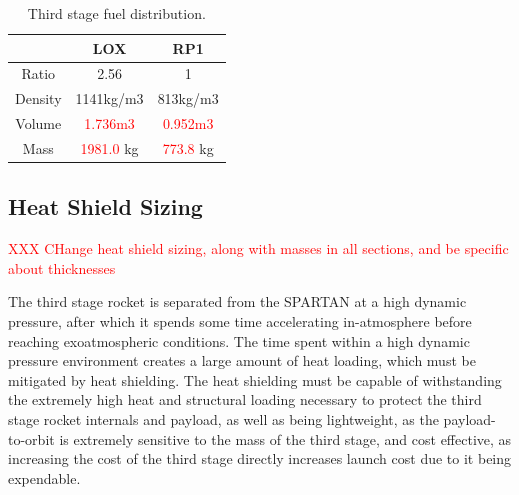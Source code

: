 	

\begin{table}[h]
	\centering
	\begin{tabular}{|c|c|c|}
		\hline  & \textbf{LOX} & \textbf{RP1} \\ 
		\hline Ratio & 2.56\cite{RPE} & 1 \\ 
		\hline Density & 1141kg/m3 & 813kg/m3\cite{Magee}\\ 
		\hline Volume & \textcolor{red}{1.736m3} & \textcolor{red}{0.952m3} \\ 
		\hline Mass & \textcolor{red}{1981.0} kg & \textcolor{red}{773.8} kg \\ 
		\hline 
	\end{tabular} 
	\caption{Third stage fuel distribution.}
	\label{tab:Fuel}
\end{table}



\subsection{Heat Shield Sizing}

\textcolor{red}{XXX CHange heat shield sizing, along with masses in all sections, and be specific about thicknesses}

The third stage rocket is separated from the SPARTAN at a high dynamic pressure, after which it spends some time accelerating in-atmosphere before reaching exoatmospheric conditions. The time spent within a high dynamic pressure environment creates a large amount of heat loading, which must be mitigated by heat shielding. The heat shielding must be capable of withstanding the extremely high heat and structural loading necessary to protect the third stage rocket internals and payload, as well as being lightweight, as the payload-to-orbit is extremely sensitive to the mass of the third stage, and cost effective, as increasing the cost of the third stage directly increases launch cost due to it being expendable. 


